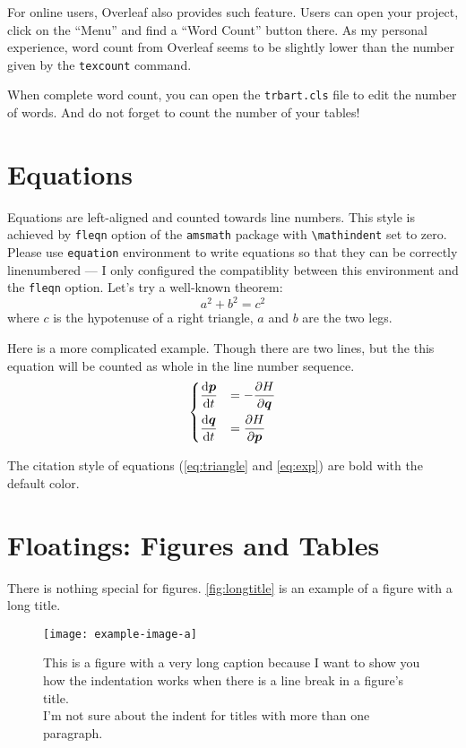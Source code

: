 \documentclass[12pt]{trbart}
\begin{document}
For online users, Overleaf also provides such feature. Users can open your project, click on the ``Menu'' and find a ``Word Count'' button there. As my personal experience, word count from Overleaf seems to be slightly lower than the number given by the \texttt{texcount} command.

When complete word count, you can open the \texttt{trbart.cls} file to edit the number of words. And do not forget to count the number of your tables!


\section{Equations}
Equations are left-aligned and counted towards line numbers. This style is achieved by \texttt{fleqn} option of the \texttt{amsmath} package with \verb+\mathindent+ set to zero. Please use \texttt{equation} environment to write equations so that they can be correctly linenumbered --- I only configured the compatiblity between this environment and the \texttt{fleqn} option. Let's try a well-known theorem:
\begin{equation}\label{eq:triangle}
    a^2 + b^2 = c^2
\end{equation}
where \(c\) is the hypotenuse of a right triangle, \(a\) and \(b\) are the two legs.

Here is a more complicated example. Though there are two lines, but the this equation will be counted as whole in the line number sequence.
\begin{equation}\label{eq:exp}
\begin{dcases}
    \frac{\mathop{}\negthinspace\mathrm{d} \boldsymbol{p}}{\mathop{}\negthinspace\mathrm{d} t} &= -\frac{\partial H}{\partial \boldsymbol{q}} \\
    \frac{\mathop{}\negthinspace\mathrm{d} \boldsymbol{q}}{\mathop{}\negthinspace\mathrm{d} t} &= \frac{\partial H}{\partial \boldsymbol{p}}
\end{dcases} 
\end{equation}

The citation style of equations (\autoref{eq:triangle} and \autoref{eq:exp}) are bold with the default color.

\section{Floatings: Figures and Tables}
There is nothing special for figures. \autoref{fig:longtitle} is an example of a figure with a long title.
\begin{figure}[!hbt]
    \centering
    \texttt{[image: example-image-a]}
    \caption{This is a figure with a very long caption because I want to show you how the indentation works when there is a line break in a figure's title.\\ I'm not sure about the indent for titles with more than one paragraph.}\label{fig:longtitle}
\end{figure}
\end{document}
